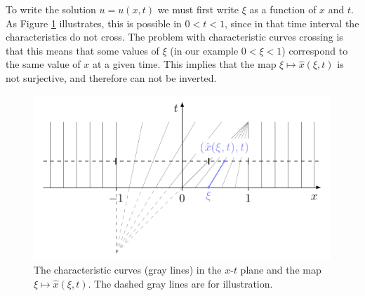 \documentclass[10pt,letterpaper]{article}
\newcommand{\frb}[1]{ \left(  {#1} \right) }
\theoremstyle{break}
\begin{document}
\begin{solution}
	To write the solution $u=u(x,t)$ we must first write $\xi$ as a function of $x$ and $t$.
	As Figure \ref{carXTplane} illustrates, this is possible in $0<t<1$, since in that time interval the characteristics do not cross.
	The problem with characteristic curves crossing is that this means that some values of $\xi$ (in our example $0<\xi<1$) correspond to the same value of $x$ at a given time.
	This implies that the map $\xi\mapsto \hat x\frb{\xi,t}$ is not surjective, and therefore can not be inverted.
	\begin{figure}
	\centering
	\includegraphics{figures01/charac_t} 
	\caption{The characteristic curves (gray lines) in the $x$-$t$ plane and the map $\xi\mapsto \hat x\frb{\xi,t}$. The dashed gray lines are for illustration.}
	\label{carXTplane}
	\end{figure}
	

\end{solution}
\end{document}
